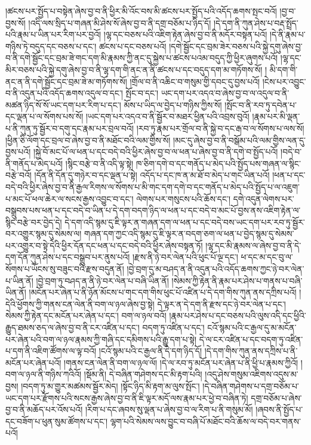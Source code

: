 །ཚངས་པར་སྤྱོད་པ་བསྟེན་ཞེས་བྱ་བ་ནི་ཕྱིར་མི་འོང་བས་མི་ཚངས་པར་སྤྱོད་པའི་འདོད་ཆགས་སྤང་བའོ། །བྱ་བ་བྱས་སོ། །འདི་ལས་སྲིད་པ་གཞན་མི་ཤེས་སོ་ཞེས་བྱ་བ་ནི་དགྲ་བཅོམ་པ་ཉིད་དོ། །དེ་དག་ནི་ཀུན་ཤེས་པ་བརྡ་སྤྲོད་པའི་རྣམ་པ་ཡིན་པར་རིག་པར་བྱའོ། །ལྷ་དང་བཅས་པའི་འཇིག་རྟེན་ཞེས་བྱ་བ་ནི་མདོར་བསྟན་པའོ། །དེ་ནི་རྣམ་པ་གཉིས་ཏེ་བདུད་དང་བཅས་པ་དང་། ཚངས་པ་དང་བཅས་པའོ། །དགེ་སྦྱོང་དང་བྲམ་ཟེར་བཅས་པའི་སྐྱེ་དགུ་ཞེས་བྱ་བ་ནི་དགེ་སྦྱོང་དང་བྲམ་ཟེ་གང་དག་མི་རྣམས་ཀྱི་ནང་དུ་སྐྱེས་པ་ཚངས་པའམ་བདུད་ཀྱི་ཕྱིར་ཞུགས་པའོ། །ལྷ་དང་མིར་བཅས་པའི་སྐྱེ་དགུ་ཞེས་བྱ་བ་ནི་ལྷ་དག་གི་ནང་ན་ནི་ཚངས་པ་དང་བདུད་དག་མ་གཏོགས་སོ། །
མི་དག་གི་ནང་ན་ནི་དགེ་སྦྱོང་དང་བྲམ་ཟེ་མ་གཏོགས་སོ། །གྲོལ་བ་ནི་འཆིང་བ་གསུམ་གྱི་དབང་དུ་བྱས་པའོ། །ངེས་པར་འབྱུང་བ་ནི་འདུན་པའི་འདོད་ཆགས་འདུལ་བ་དང་། སྤོང་བ་དང་། ཡང་དག་པར་འདའ་བ་ཞེས་བྱ་བ་ལ་འདུལ་བ་ནི་མཚན་ཉིད་སོ་སོ་ཡང་དག་པར་རིག་པ་དང་། མོས་པ་ཡིད་ལ་བྱེད་པ་གཉིས་ཀྱིས་སོ། །སྤོང་བ་ནི་རབ་ཏུ་དབེན་པ་དང་ལྡན་པ་ལ་སོགས་པས་སོ། །ཡང་དག་པར་འདའ་བ་ནི་སྦྱོར་བ་མཐར་ཕྱིན་པའི་འབྲས་བུའོ། །རྣམ་པར་མི་ལྡན་པ་ནི་ཀུན་ཏུ་སྦྱོར་བ་དགུ་དང་རྣམ་པར་བྲལ་བའོ། །རབ་ཏུ་རྣམ་པར་གྲོལ་བ་ནི་སྐྱེ་བ་དང་རྒ་བ་ལ་སོགས་པ་ལས་སོ། །ཕྱིན་ཅི་ལོག་དང་བྲལ་བ་ཞེས་བྱ་བ་ནི་མཐོང་བའི་ལམ་གྱིས་སོ། །མང་དུ་ཞེས་བྱ་བ་ནི་བསྒོམ་པའི་ལམ་གྱིས་ལན་དུ་བྱས་པའོ། །སྐྱེ་བོ་མང་པོ་ལ་ཕན་པ་དང་བདེ་བའི་ཕྱིར་ཞེས་བྱ་བ་ལ་ཕན་པ་ཞེས་བྱ་བ་ནི་དགེ་བ་སྤྱོད་པའོ། །བདེ་བ་ནི་གནོད་པ་མེད་པའོ། །སྙིང་བརྩེ་བ་ནི་འདི་ལྟ་སྟེ། ཁ་ཅིག་དགེ་བ་དང་གནོད་པ་མེད་པའི་སྤྱོད་པས་གཞན་ལ་སྙིང་བརྩེ་བའོ། །དོན་ནི་དོན་དུ་གཉེར་བ་དང་ལྡན་པ་སྟེ། འདོད་པ་དང་ཁ་ན་མ་ཐོ་བ་མེད་པ་གང་ཡིན་པའོ། །ཕན་པ་དང་བདེ་བའི་ཕྱིར་ཞེས་བྱ་བ་ནི་རྒྱལ་རིགས་ལ་སོགས་པ་མི་གང་དག་དགེ་བ་དང་གནོད་པ་མེད་པའི་སྤྱོད་པ་ལ་འཇུག་པ་མང་པོ་ཕལ་ཆེར་ལ་སངས་རྒྱས་འབྱུང་བ་དང་། ལེགས་པར་གསུངས་པའི་ཆོས་དང་། དགེ་འདུན་ལེགས་པར་བསྒྲུབས་པས་ཕན་པ་དང་བདེ་བ་ཡིན་པ་དེ་དག་བདག་ཉིད་ལ་ཕན་པ་དང་བདེ་བ་མང་པོ་བྱས་ནས་འཇིག་རྟེན་ལ་སྙིང་བརྩེ་བར་བྱེད་དེ། དེ་དག་འདི་སྙམ་དུ་ཇི་ལྟར་ན་གཞན་དག་ལ་ཕན་པ་དང་བདེ་བས་ཡང་དག་པར་རབ་ཏུ་སྦྱོར་བར་འགྱུར་སྙམ་དུ་སེམས་ལ། གཞན་དག་ཀྱང་འདི་སྙམ་དུ་ཇི་ལྟར་ན་བདག་ཅག་ལ་ཕན་པ་བྱེད་སྙམ་དུ་སེམས་པར་འགྱུར་བ་སྟེ་དེའི་ཕྱིར་དོན་དང་ཕན་པ་དང་བདེ་བའི་ཕྱིར་ཞེས་བསྟན་ཏོ། །ལྷ་དང་མི་རྣམས་ལ་ཞེས་བྱ་བ་ནི་དེ་དག་དོན་ཀུན་ཤེས་པ་དང་བསྒྲུབ་པར་ནུས་པའོ། །རྫས་ནི་ཉེ་བར་ལེན་པའི་ཕུང་པོ་ལྔ་དང་། ཕ་དང་མ་དང་བུ་ལ་སོགས་པ་ཡོངས་སུ་བཟུང་བའི་རྫས་བདུན་ནོ། །བྱེ་བྲག་དུ་མ་བཤད་ན་ནི་འདུན་པའི་འདོད་ཆགས་ཀྱང་ཉེ་བར་ལེན་པ་ཡིན་ནོ། །བྱེ་བྲག་ཏུ་བཤད་ན་ནི་ཉེ་བར་ལེན་པ་བཞི་ཡིན་ནོ། །སེམས་ཀྱི་རྟེན་ནི་རྣམ་པར་ཤེས་པ་གནས་པ་བཞི་ཡིན་ནོ། །མངོན་པར་ཞེན་པ་ནི་ཉོན་མོངས་པ་གང་དག་གིས་ཕུང་པོ་འཛིན་པ་དེ་དག་གིས་ཀུན་ནས་དཀྲིས་པའོ། །དེའི་ཕྱོགས་ཀྱི་གནས་ངན་ལེན་ནི་བག་ལ་ཉལ་ཞེས་བྱ་སྟེ། དེ་ལྟར་ན་དེ་དག་ནི་རྫས་དང་ཉེ་བར་ལེན་པ་དང་། སེམས་ཀྱི་རྟེན་དང་མངོན་པར་ཞེན་པ་དང་། བག་ལ་ཉལ་བའོ། །རྣམ་པར་ཤེས་པ་དང་བཅས་པའི་ལུས་འདི་དང་ཕྱིའི་རྒྱུད་ཐམས་ཅད་ལ་ཞེས་བྱ་བ་ནི་ངར་འཛིན་པ་དང་། བདག་ཏུ་འཛིན་པ་དང་། ངའོ་སྙམ་པའི་ང་རྒྱལ་དུ་མ་མངོན་པར་ཞེན་པའི་བག་ལ་ཉལ་རྣམས་ཀྱི་གཞི་དང་དམིགས་པའི་རྒྱུ་དག་པ་སྟེ། དེ་ལ་ངར་འཛིན་པ་དང་བདག་ཏུ་འཛིན་པ་དག་ནི་འཇིག་ཚོགས་ལ་ལྟ་བའོ། །ངའོ་སྙམ་པའི་ང་རྒྱལ་ནི་དེ་དག་ཉིད་དོ། །དེ་དག་གིས་ཀུན་ནས་དཀྲིས་པ་ནི་མངོན་པར་ཞེན་པའོ། །གནས་ངན་ལེན་ནི་བག་ལ་ཉལ་ལོ། །དེ་ལ་རབ་ཏུ་མངོན་པར་ཞེན་པ་ནི་ཕྱི་པ་རྣམས་ཀྱིའོ། །བག་ལ་ཉལ་ནི་གཉིས་ཀའིའོ། །སྡོམ་ནི། དེ་བཞིན་གཤེགས་དང་མི་རྟག་པའི། །འདུ་ཤེས་གསུམ་འཇིགས་འདུས་མ་བྱས། །བདག་ཏུ་མ་གྱུར་མཚམས་སྦྱོར་མེད། །སྟོང་ཉིད་མི་རྟག་མ་ལུས་སྤོང་། །དེ་བཞིན་གཤེགས་པ་དགྲ་བཅོམ་པ་ཡང་དག་པར་རྫོགས་པའི་སངས་རྒྱས་ཞེས་བྱ་བ་ནི་ཇི་ལྟར་མདོ་ལས་རྣམ་པར་ཕྱེ་བ་བཞིན་ཏེ། དགྲ་བཅོམ་པ་ཞེས་བྱ་བ་ནི་མཆོད་པར་འོས་པའོ། །རིག་པ་དང་ཞབས་སུ་ལྡན་པ་ཞེས་བྱ་བ་ལ་རིག་པ་ནི་གསུམ་མོ། །ཞབས་ནི་སྤྱོད་པ་དང་བཟོག་པ་ཕུན་སུམ་ཚོགས་པ་དང་། ལྷག་པའི་སེམས་ལས་བྱུང་བ་བཞི་པོ་མཐོང་བའི་ཆོས་ལ་བདེ་བར་གནས་པའོ། 